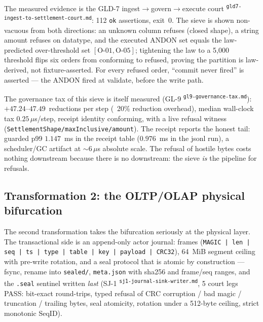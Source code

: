 \documentclass[11pt,a4paper]{article}
\newcommand{\art}[1]{\textsuperscript{\tiny\texttt{#1}}}
\begin{document}
The measured evidence is the GLD-7 ingest$\to$govern$\to$execute court
\art{gld7-ingest-to-settlement-court.md}: 112 \texttt{ok} assertions, exit~0. The sieve is
shown non-vacuous from both directions: an unknown column refuses (closed shape), a string
amount refuses on datatype, and the executed ANDON set equals the law-predicted over-threshold
set $[\text{O-01}, \text{O-05}]$; tightening the law to a 5{,}000 threshold flips six orders
from conforming to refused, proving the partition is law-derived, not fixture-asserted.
For every refused order, ``commit never fired'' is asserted --- the ANDON fired at validate,
before the write path.

The governance tax of this sieve is itself measured (GL-9
\art{gl9-governance-tax.md}): $+47.24$--$47.49$~reductions per step (~20\% reduction
overhead), median wall-clock tax $0.25\,\mu$s/step, receipt identity conforming, with a live
refusal witness (\texttt{SettlementShape/maxInclusive/amount}). The receipt reports the
honest tail: guarded p99 $1.147$~ms in the receipt table ($0.976$~ms in the jsonl run), a
scheduler/GC artifact at $\sim$6\,$\mu$s absolute scale. The refusal of hostile bytes costs
nothing downstream because there is no downstream: the sieve
\emph{is} the pipeline for refusals.

\subsection{Transformation 2: the OLTP/OLAP physical bifurcation}

The second transformation takes the bifurcation seriously at the physical layer. The
transactional side is an append-only actor journal: frames
(\texttt{MAGIC | len | seq | ts | type | table | key | payload | CRC32}), 64~MiB segment
ceiling with pre-write rotation, and a seal protocol that is atomic by construction ---
fsync, rename into \texttt{sealed/}, \texttt{meta.json} with sha256 and frame/seq ranges,
and the \texttt{.seal} sentinel written \emph{last} (SJ-1
\art{sj1-journal-sink-writer.md}, 5 court legs PASS: bit-exact round-trips, typed refusal of
CRC corruption / bad magic / truncation / trailing bytes, seal atomicity, rotation under a
512-byte ceiling, strict monotonic SeqID).
\end{document}
